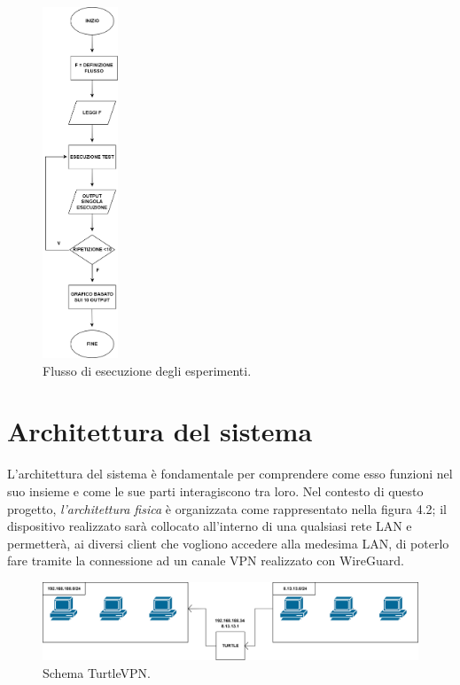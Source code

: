 \begin{figure}[h] \includegraphics[width=0.2\textwidth] {Tesi magistrale/capitoli/images/flow.png}
\centering
\caption{Flusso di esecuzione degli esperimenti.}
\end{figure}

\newpage
\section{Architettura del sistema}
L'architettura del sistema è fondamentale per comprendere come esso funzioni nel suo insieme e come le sue parti interagiscono tra loro. Nel contesto di questo progetto, \emph{l'architettura fisica} è organizzata come rappresentato nella figura 4.2; il dispositivo realizzato sarà collocato all'interno di una qualsiasi rete LAN e permetterà, ai diversi client che vogliono accedere alla medesima LAN, di poterlo fare tramite la connessione ad un canale VPN realizzato con WireGuard.
\begin{figure}[h] \includegraphics[width=1\textwidth] {Tesi magistrale/capitoli/images/Schema turtle.png}
\centering
\caption{Schema TurtleVPN.}
\end{figure}


